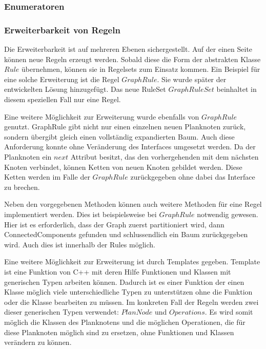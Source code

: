 \subsubsection{Enumeratoren}





















\subsubsection{Erweiterbarkeit von Regeln}

Die Erweiterbarkeit ist auf mehreren Ebenen sichergestellt. Auf der einen Seite können neue Regeln erzeugt werden. Sobald diese die Form der abstrakten Klasse $Rule$ übernehmen, können sie in Regelsets zum Einsatz kommen. Ein Beispiel für eine solche Erweiterung ist die Regel $GraphRule$. Sie wurde später der entwickelten Lösung hinzugefügt. Das neue RuleSet $GraphRuleSet$ beinhaltet in diesem speziellen Fall nur eine Regel.

Eine weitere Möglichkeit zur Erweiterung wurde ebenfalls von $GraphRule$ genutzt. GraphRule gibt nicht nur einen einzelnen neuen Planknoten zurück, sondern übergibt gleich einen vollständig expandierten Baum. Auch diese Anforderung konnte ohne Veränderung des Interfaces umgesetzt werden. Da der Planknoten ein $next$ Attribut besitzt, das den vorhergehenden mit dem nächsten Knoten verbindet, können Ketten von neuen Knoten gebildet werden. Diese Ketten werden im Falle der $GraphRule$ zurückgegeben ohne dabei das Interface zu brechen.

Neben den vorgegebenen  Methoden können auch weitere Methoden für eine Regel implementiert werden. Dies ist beispielsweise bei $GraphRule$ notwendig gewesen. Hier ist es erforderlich, dass der Graph zuerst partitioniert wird, dann ConnectedComponents gefunden und schlussendlich ein Baum zurückgegeben wird. Auch dies ist innerhalb der Rules möglich.

Eine weitere Möglichkeit zur Erweiterung ist durch Templates gegeben. Template ist eine Funktion von C++ mit deren Hilfe Funktionen und Klassen mit generischen Typen arbeiten können. Dadurch ist es einer Funktion der einen Klasse möglich viele unterschiedliche Typen zu unterstützen ohne die Funktion oder die Klasse bearbeiten zu müssen. Im konkreten Fall der Regeln werden zwei dieser generischen Typen verwendet: $PlanNode$ und $Operations$. Es wird somit möglich die Klassen des Planknotens und die möglichen Operationen, die für diese Planknoten möglich sind zu ersetzen, ohne Funktionen und Klassen verändern zu können.



